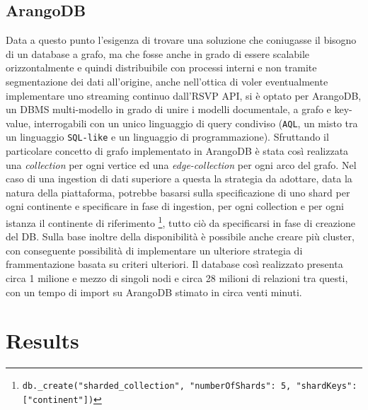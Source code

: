 \documentclass[fleqn,10pt]{SelfArx} %
\begin{document}
{\subsection{ArangoDB}
Data a questo punto l'esigenza di trovare una soluzione che coniugasse il bisogno di un database a grafo, ma che fosse anche in grado di essere scalabile orizzontalmente e quindi distribuibile con processi interni e non tramite segmentazione dei dati all'origine, anche nell'ottica di voler eventualmente implementare uno streaming continuo dall'RSVP API, si è optato per ArangoDB, un DBMS multi-modello in grado di unire i modelli documentale, a grafo e key-value, interrogabili con un unico linguaggio di query condiviso (\texttt{AQL}, un misto tra un linguaggio \texttt{SQL-like} e un linguaggio di programmazione). %
Sfruttando il particolare concetto di grafo implementato in ArangoDB è stata così realizzata una \textit{collection} per ogni vertice ed una \textit{edge-collection} per ogni arco del grafo. 
Nel caso di una ingestion di dati superiore a questa la strategia da adottare, data la natura della piattaforma, potrebbe basarsi sulla specificazione di uno shard per ogni continente e specificare in fase di ingestion, per ogni collection e per ogni istanza il continente di riferimento 
\footnote{\texttt{db.\_create("sharded\_collection", {"numberOfShards": 5, "shardKeys": ["continent"]})}}, tutto ciò da specificarsi in fase di creazione del DB. 
Sulla base inoltre della disponibilità è possibile anche creare più cluster, con conseguente possibilità di implementare un ulteriore strategia di frammentazione basata su criteri ulteriori.
Il database così realizzato presenta circa 1 milione e mezzo di singoli nodi e circa 28 milioni di relazioni tra questi, con un tempo di import su ArangoDB stimato in circa venti minuti.

\section{Results}
}
\end{document}
